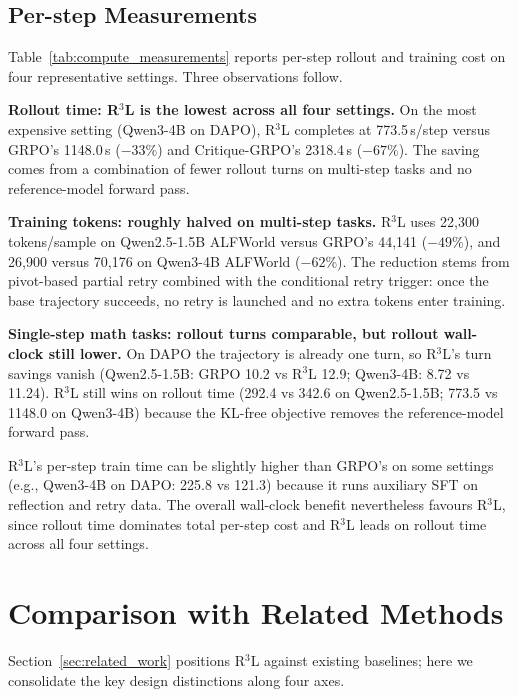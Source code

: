 \documentclass[11pt]{article}
\theoremstyle{definition}
\theoremstyle{remark}
\begin{document}
\subsection{Per-step Measurements}



Table~\ref{tab:compute_measurements} reports per-step rollout and training cost on four representative settings. Three observations follow.

\textbf{Rollout time: R$^3$L is the lowest across all four settings.} On the most expensive setting (Qwen3-4B on DAPO), R$^3$L completes at 773.5\,s/step versus GRPO's 1148.0\,s ($-33\%$) and Critique-GRPO's 2318.4\,s ($-67\%$). The saving comes from a combination of fewer rollout turns on multi-step tasks and no reference-model forward pass.

\textbf{Training tokens: roughly halved on multi-step tasks.} R$^3$L uses 22{,}300 tokens/sample on Qwen2.5-1.5B ALFWorld versus GRPO's 44{,}141 ($-49\%$), and 26{,}900 versus 70{,}176 on Qwen3-4B ALFWorld ($-62\%$). The reduction stems from pivot-based partial retry combined with the conditional retry trigger: once the base trajectory succeeds, no retry is launched and no extra tokens enter training.

\textbf{Single-step math tasks: rollout turns comparable, but rollout wall-clock still lower.} On DAPO the trajectory is already one turn, so R$^3$L's turn savings vanish (Qwen2.5-1.5B: GRPO 10.2 vs R$^3$L 12.9; Qwen3-4B: 8.72 vs 11.24). R$^3$L still wins on rollout time (292.4 vs 342.6 on Qwen2.5-1.5B; 773.5 vs 1148.0 on Qwen3-4B) because the KL-free objective removes the reference-model forward pass.

R$^3$L's per-step train time can be slightly higher than GRPO's on some settings (e.g., Qwen3-4B on DAPO: 225.8 vs 121.3) because it runs auxiliary SFT on reflection and retry data. The overall wall-clock benefit nevertheless favours R$^3$L, since rollout time dominates total per-step cost and R$^3$L leads on rollout time across all four settings.

\section{Comparison with Related Methods}
\label{sec:related_comparison}

Section~\ref{sec:related_work} positions R$^3$L against existing baselines; here we consolidate the key design distinctions along four axes.
\end{document}
